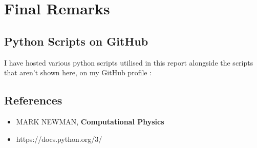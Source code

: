 \section{Final Remarks}
\subsection{Python Scripts on GitHub}
I have hosted various python scripts utilised in this report alongside the scripts that aren't shown here, on my GitHub profile :  
\subsection{References}
\begin{itemize}
	\item MARK NEWMAN, \textbf{ Computational Physics}
	\item https://docs.python.org/3/
	
	
\end{itemize}

